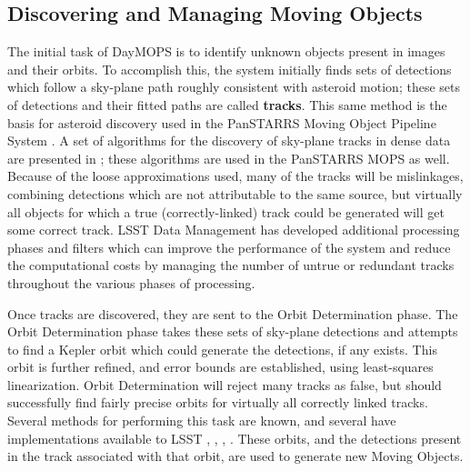 \documentclass[12pt,preprint]{aastex}
\begin{document}
\subsection{Discovering and Managing Moving Objects}


The initial task of DayMOPS is to identify unknown objects present in
images and their orbits.  To accomplish this, the system initially
finds sets of detections which follow a sky-plane path roughly
consistent with asteroid motion; these sets of detections and their
fitted paths are called \textbf{tracks}.  This same method is the
basis for asteroid discovery used in the PanSTARRS Moving Object
Pipeline System \citep{psMOPSDesign}.  A set of algorithms for the
discovery of sky-plane tracks in dense data are presented in
\citet{Kubica:2005:MTA:1081870.1081889}; these algorithms are used in
the PanSTARRS MOPS as well.  Because of the loose approximations used,
many of the tracks will be mislinkages, combining detections which are
not attributable to the same source, but virtually all objects for
which a true (correctly-linked) track could be generated will get some
correct track.  LSST Data Management has developed additional
processing phases and filters which can improve the performance of the
system and reduce the computational costs by managing the number of
untrue or redundant tracks throughout the various phases of
processing.


Once tracks are discovered, they are sent to the Orbit Determination
phase. The Orbit Determination phase takes these sets of sky-plane
detections and attempts to find a Kepler orbit which could generate
the detections, if any exists.  This orbit is further refined, and
error bounds are established, using least-squares linearization.
Orbit Determination will reject many tracks as false, but should
successfully find fairly precise orbits for virtually all correctly
linked tracks.  Several methods for performing this task are known,
and several have implementations available to LSST
\citep{Milani04orbitdetermination}, \citep{Milani2006},
\citep{OpenOrb2009}, \citep{granvik_thesis}.  These orbits, and the
detections present in the track associated with that orbit, are used
to generate new Moving Objects.
\end{document}
